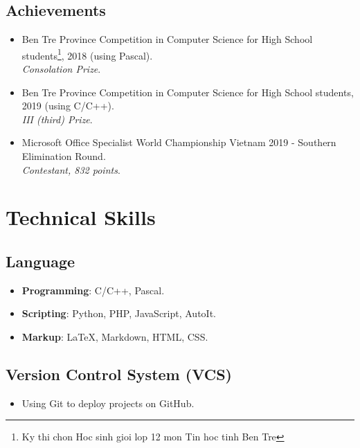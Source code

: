 \documentclass{article}
\begin{document}
        \subsection{Achievements}
            \begin{itemize}
                \item {Ben Tre Province Competition in Computer Science for High School students\footnote{Ky thi chon Hoc sinh gioi lop 12 mon Tin hoc tinh Ben Tre}, 2018 (using Pascal)}.\\
                \textit{Consolation Prize}.

                \item {Ben Tre Province Competition in Computer Science for High School students, 2019 (using C/C++)}.\\
                \textit{III (third) Prize}.

                \item {Microsoft Office Specialist World Championship Vietnam 2019 - Southern Elimination Round}.\\
                \textit{Contestant, 832 points}.
            \end{itemize}

    \section{Technical Skills}
        \subsection{Language}
        \begin{itemize}
            \item \textbf{Programming}: C/C++, Pascal.
            \item \textbf{Scripting}: Python, PHP, JavaScript, AutoIt.
            \item \textbf{Markup}: \LaTeX, Markdown, HTML, CSS.
        \end{itemize}

        \subsection{Version Control System (VCS)}
        \begin{itemize}
            \item Using Git to deploy projects on GitHub.
        \end{itemize}
\end{document}
